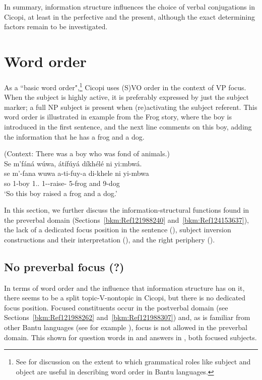 \documentclass[output=paper]{langscibook}
\begin{document}
\z
\z

In summary, information structure influences the choice of verbal conjugations in Cicopi, at least in the perfective and the present, although the exact determining factors remain to be investigated.

\section{Word order}
\label{bkm:Ref141344123}
As a ``basic word order",\footnote{See \citet{KerrEtAl2023} for discussion on the extent to which grammatical roles like subject and object are useful in describing word order in Bantu languages.} Cicopi uses (S)VO order in the context of VP focus. When the subject is highly active, it is preferably expressed by just the subject marker;  a full NP subject is present when (re)activating the subject referent. This word order is illustrated in example  from the Frog story, where the boy is introduced in the first sentence, and the next line comments on this boy, adding the information that he has a frog and a dog.
\largerpage[-1]\pagebreak

\ea
\label{bkm:Ref121988028}
(Context: There was a boy who was fond of animals.)\\
Se m’fáná wúwa, átífúyá díkhélé ni yi:mbwá.\\
\gll
se  m’-fana  wuwa  a-ti-fuy-a  di-khele  ni  yi-mbwa\\
so  1-boy  1.\DEM{}.\PROX{}  1\SM{}-\IPFV{}-raise-\FV{}  5-frog  and  9-dog\\
\glt
‘So this boy raised a frog and a dog.’\\

\z

In this section, we further discuss the information-structural functions found in the preverbal domain (Sections~\ref{bkm:Ref121988240} and~\ref{bkm:Ref124153637}), the lack of a dedicated focus position in the sentence (), subject inversion constructions and their interpretation (), and the right periphery ().


\subsection{No preverbal focus (?)}
\label{bkm:Ref120693404}\label{bkm:Ref121988240}
In terms of word order and the influence that information structure has on it, there seems to be a split topic-V-nontopic in Cicopi, but there is no dedicated focus position. Focused constituents occur in the postverbal domain (see Sections~\ref{bkm:Ref121988262} and~\ref{bkm:Ref121988307}) and, as is familiar from other Bantu languages (see for example \textcite{chapters/makhuwa}), focus is not allowed in the preverbal domain. This shown for question words in  and answers in , both focused subjects. 
\end{document}
